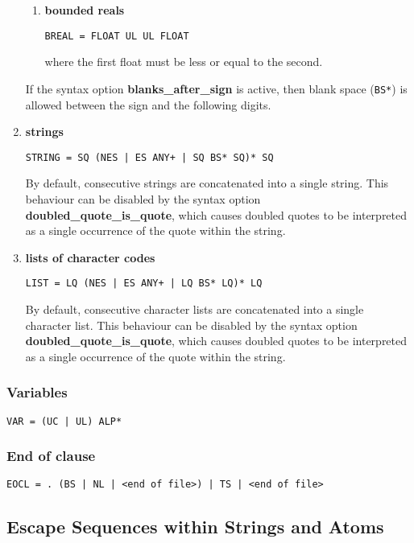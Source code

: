 \begin{enumerate}
\begin{enumerate}
\item{\bf bounded reals}
\begin{verbatim}
BREAL = FLOAT UL UL FLOAT
\end{verbatim}
where the first float must be less or equal to the second.

\end{enumerate}

If the syntax option {\bf blanks_after_sign} is active, then
blank space (\verb+BS*+) is allowed between the sign and the following digits.


\item{\bf strings}
\begin{verbatim}
STRING = SQ (NES | ES ANY+ | SQ BS* SQ)* SQ
\end{verbatim}
By default, consecutive strings are concatenated into a single string.
This behaviour can be disabled by the syntax option
{\bf doubled_quote_is_quote}, which causes doubled quotes to be
interpreted as a single occurrence of the quote within the string.

\item{\bf lists of character codes} 
\begin{verbatim}
LIST = LQ (NES | ES ANY+ | LQ BS* LQ)* LQ
\end{verbatim}
By default, consecutive character lists are concatenated into a single character list.
This behaviour can be disabled by the syntax option
{\bf doubled_quote_is_quote}, which causes doubled quotes to be
interpreted as a single occurrence of the quote within the string.
\end{enumerate}

\subsubsection{Variables}
\begin{verbatim}
VAR = (UC | UL) ALP*
\end{verbatim}

\subsubsection{End of clause}
\begin{verbatim}
EOCL = . (BS | NL | <end of file>) | TS | <end of file>
\end{verbatim}


\subsection{Escape Sequences within Strings and Atoms}


